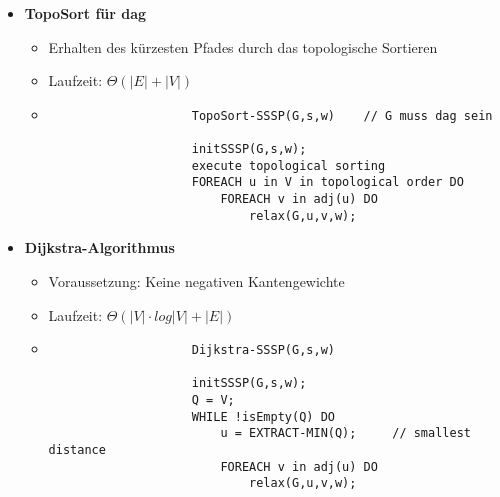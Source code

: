 \begin{itemize}
\begin{itemize}
\begin{verbatim}
                    initSSSP(G,s,w);
                    FOR i = 1 TO |V|-1 DO
                        FOREACH (u,v) in E DO
                            relax(G,u,v,w);
                    FOREACH (u,v) in E DO   // Prüfung ob negativer Zyklus
                        IF v.dist > u.dist+w((u,v)) THEN
                            return false;
                    return true;

                    initSSSP(G,s,w)

                    FOREACH v in V DO
                        v.dist = |$\infty$|;
                        v.pred = nil;
                    s.dist = 0;
                    \end{verbatim}
            \end{itemize}

        \item \textbf{TopoSort für dag}
            \begin{itemize}
                \item Erhalten des kürzesten Pfades durch das topologische Sortieren
                \item Laufzeit: $\Theta(|E| + |V|)$
                \item[]
                    \begin{verbatim}
                    TopoSort-SSSP(G,s,w)    // G muss dag sein

                    initSSSP(G,s,w);
                    execute topological sorting
                    FOREACH u in V in topological order DO
                        FOREACH v in adj(u) DO
                            relax(G,u,v,w);
                    \end{verbatim}
            \end{itemize}

        \item \textbf{Dijkstra-Algorithmus}
            \begin{itemize}
                \item Voraussetzung: Keine negativen Kantengewichte
                \item Laufzeit: $\Theta(|V| \cdot log|V| + |E|)$
                \item[]
                    \begin{verbatim}
                    Dijkstra-SSSP(G,s,w)

                    initSSSP(G,s,w);
                    Q = V;
                    WHILE !isEmpty(Q) DO
                        u = EXTRACT-MIN(Q);     // smallest distance
                        FOREACH v in adj(u) DO
                            relax(G,u,v,w);
                    \end{verbatim}
            \end{itemize}
    \end{itemize}

